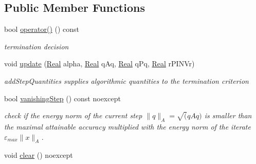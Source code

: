 \subsection*{Public Member Functions}
\begin{DoxyCompactItemize}
\item 
bool \hyperlink{classSpacy_1_1CG_1_1Termination_1_1StrakosTichyEnergyError_aac549148bdb1407e6d3f4e41cceb240b_aac549148bdb1407e6d3f4e41cceb240b}{operator()} () const 
\begin{DoxyCompactList}\small\item\em termination decision \end{DoxyCompactList}\item 
void \hyperlink{classSpacy_1_1CG_1_1Termination_1_1StrakosTichyEnergyError_a1ab7f5d5bfe95629caedfba6a6d974af_a1ab7f5d5bfe95629caedfba6a6d974af}{update} (\hyperlink{classSpacy_1_1Real}{Real} alpha, \hyperlink{classSpacy_1_1Real}{Real} q\+Aq, \hyperlink{classSpacy_1_1Real}{Real} q\+Pq, \hyperlink{classSpacy_1_1Real}{Real} r\+P\+I\+N\+Vr)
\begin{DoxyCompactList}\small\item\em add\+Step\+Quantities supplies algorithmic quantities to the termination criterion \end{DoxyCompactList}\item 
bool \hyperlink{classSpacy_1_1CG_1_1Termination_1_1StrakosTichyEnergyError_a1fa1f92b7caa9e9d9f929e14d70b3a7c_a1fa1f92b7caa9e9d9f929e14d70b3a7c}{vanishing\+Step} () const noexcept
\begin{DoxyCompactList}\small\item\em check if the energy norm of the current step $\|q\|_A=\sqrt(qAq)$ is smaller than the maximal attainable accuracy multiplied with the energy norm of the iterate $\varepsilon_{max}\|x\|_A$. \end{DoxyCompactList}\item 
\hypertarget{classSpacy_1_1CG_1_1Termination_1_1StrakosTichyEnergyError_ad432a8f91481780c3a7fa74743ac3256}{}void \hyperlink{classSpacy_1_1CG_1_1Termination_1_1StrakosTichyEnergyError_ad432a8f91481780c3a7fa74743ac3256}{clear} () noexcept\label{classSpacy_1_1CG_1_1Termination_1_1StrakosTichyEnergyError_ad432a8f91481780c3a7fa74743ac3256}


\end{DoxyCompactItemize}

